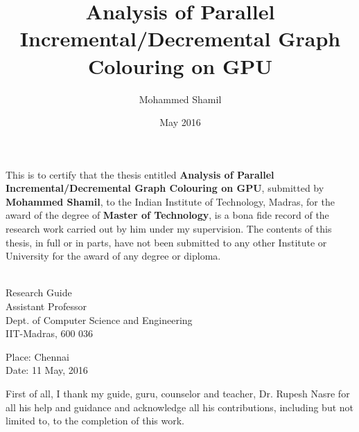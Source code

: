 \documentclass[MTech]{iitmdiss}
\def\thesistitle{Analysis of Parallel Incremental/Decremental Graph Colouring on GPU}
\def\thesisauthor{Mohammed Shamil}
\begin{document}


\title{\thesistitle}

\author{\thesisauthor}

\date{May 2016}

\begin{singlespace}
\maketitle 
\end{singlespace} 

\certificate

\vspace*{0.5in}

\noindent This is to certify that the thesis entitled {\bf {\thesistitle}}, 
submitted by {\bf {\thesisauthor}}, to the Indian Institute of Technology, 
Madras, for the award of the degree of {\bf Master of Technology}, 
is a bona fide record of the research work carried out by him under my
supervision. The contents of this thesis, in full or in parts, have not been
submitted to any other Institute or University for the award of any degree or
diploma.

\vspace*{1.4in}
\hspace*{-0.25in}
\begin{singlespace}
 \\
\noindent Research Guide \\ 
\noindent Assistant Professor \\
\noindent Dept. of Computer Science and Engineering\\
\noindent IIT-Madras, 600 036 \\
\end{singlespace}
\vspace*{0.20in}
\noindent Place: Chennai\\ 
Date: 11 May, 2016

\acknowledgements
First of all, I thank my guide, guru, counselor and teacher, Dr. Rupesh Nasre for all his help and guidance and acknowledge all his contributions, including but not limited to, to the completion of this work.
\end{document}
